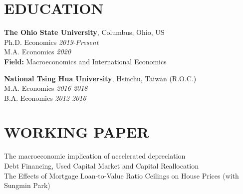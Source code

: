 \documentclass[10pt]{res} %
\begin{document}
\begin{resume}






\section{EDUCATION}

\vspace{8pt} %

{\bf The Ohio State University}, Columbus, Ohio, US \\
Ph.D. Economics \hfill  \textit{2019-Present} \\
M.A. Economics \hfill  \textit{2020} \\
\textbf{Field: } Macroeconomics and International Economics

{\bf National Tsing Hua University}, Hsinchu, Taiwan (R.O.C.) \\
M.A. Economics \hfill  \textit{2016-2018} \\
B.A. Economics \hfill  \textit{2012-2016} \\

\vspace{-10pt}

\section{WORKING PAPER}
\label{sec:research_experience}
The macroeconomic implication of accelerated depreciation \\
Debt Financing, Used Capital Market and Capital Reallocation \\
The Effects of Mortgage Loan-to-Value Ratio Ceilings on House Prices (with Sungmin Park) \\


\end{resume}
\end{document}
